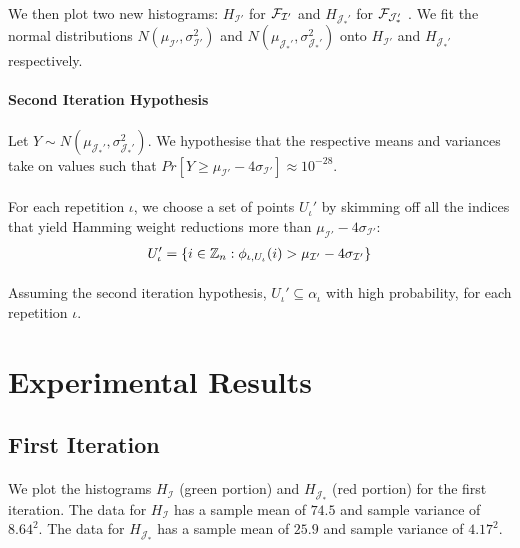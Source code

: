 \paragraph{}
We then plot two new histograms: $H_{\mathcal{I}'}$ for $\mathcal{F}_{\mathcal{I}'}$ and $H_{\mathcal{J}_*'}$ for $\mathcal{F}_{\mathcal{J}_*'}$ . We fit the normal distributions $N(\mu_{\mathcal{I}'}, \sigma_{\mathcal{I}'}^2)$ and $N(\mu_{\mathcal{J}_*'}, \sigma_{\mathcal{J}_*'}^2)$ onto $H_{\mathcal{I}'}$ and $H_{\mathcal{J}_*'}$ respectively.

\paragraph{\textbf{Second Iteration Hypothesis}} Let $Y \sim N(\mu_{\mathcal{J}_*'}, \sigma_{\mathcal{J}_*'}^2)$. We hypothesise that the respective means and variances take on values such that $Pr[Y \geq \mu_{\mathcal{I}'} - 4 \sigma_{\mathcal{I}'}] \approx 10^{-28}$.

\paragraph{}
For each repetition $\iota$, we choose a set of points $U_\iota'$ by skimming off all the indices that yield Hamming weight reductions more than $\mu_{\mathcal{I}'} - 4 \sigma_{\mathcal{I}'}$:
\begin{align*}
    U_\iota' = \{ i \in \mathbb{Z}_n : \phi_{\iota, U_\iota}(i) > \mu_{\mathcal{I}'} - 4 \sigma_{\mathcal{I}'} \}
\end{align*}

\paragraph{}
Assuming the second iteration hypothesis, $U_\iota' \subseteq \alpha_\iota$ with high probability, for each repetition $\iota$.

\section{Experimental Results}\label{expt_results}

\subsection{First Iteration}
\paragraph{}
We plot the histograms $H_{\mathcal{I}}$ (green portion) and $H_{\mathcal{J}_*}$ (red portion) for the first iteration. The data for $H_{\mathcal{I}}$ has a sample mean of $74.5$ and sample variance of $8.64^2$. The data for $H_{\mathcal{J}_*}$ has a sample mean of $25.9$ and sample variance of $4.17^2$.
